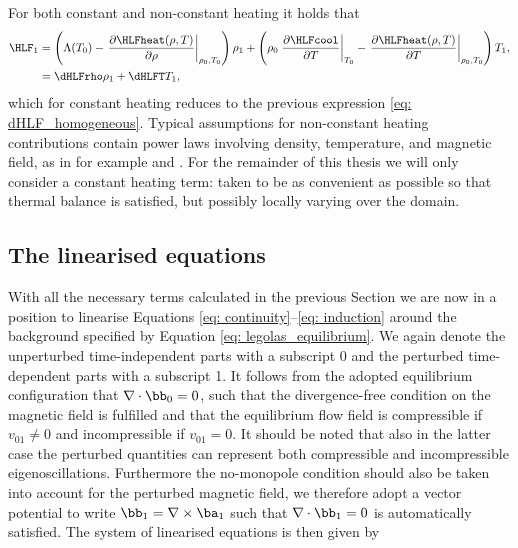 For both constant and non-constant heating it holds that
\begin{equation} \label{eq: perturbed_HLF}
  \begin{aligned}
    \HLF_1 &= \left(
      \Lambda(T_0) - \left.\frac{\partial \HLFheat(\rho, T)}{\partial \rho}\right|_{\rho_0, T_0}
    \right)\rho_1 + \left(
      \rho_0 \left.\frac{\partial \HLFcool}{\partial T}\right|_{T_0}
      - \left.\frac{\partial \HLFheat(\rho, T)}{\partial T}\right|_{\rho_0, T_0}
    \right) T_1, \\
          &= \dHLFrho \rho_1 + \dHLFT T_1,
  \end{aligned}
\end{equation}
which for constant heating reduces to the previous expression \eqref{eq: dHLF_homogeneous}. Typical assumptions for non-constant heating contributions contain power laws involving density, temperature, and magnetic field, as in for example \citet{kolotkov2019} and \citet{duckenfield2021}. For the remainder of this thesis we will only consider a constant heating term: taken to be as convenient as possible so that thermal balance is satisfied, but possibly locally varying over the domain.

\subsection{The linearised equations}
With all the necessary terms calculated in the previous Section we are now in a position to linearise Equations \eqref{eq: continuity}--\eqref{eq: induction} around the background specified by Equation \eqref{eq: legolas_equilibrium}. We again denote the unperturbed time-independent parts with a subscript 0 and the perturbed time-dependent parts with a subscript 1. It follows from the adopted equilibrium configuration that $\nabla \cdot \bb_0 = 0$, such that the divergence-free condition on the magnetic field is fulfilled and that the equilibrium flow field is compressible if
$v_{01} \neq 0$ and incompressible if $v_{01} = 0$. It should be noted that also in the latter case the perturbed quantities can represent both compressible and incompressible eigenoscillations. Furthermore the no-monopole condition should also be taken into account for the perturbed magnetic field, we therefore adopt a vector potential to write $\bb_1 = \nabla \times \ba_1$ such that $\nabla \cdot \bb_1 = 0$ is automatically satisfied. The system of linearised equations is then given by


